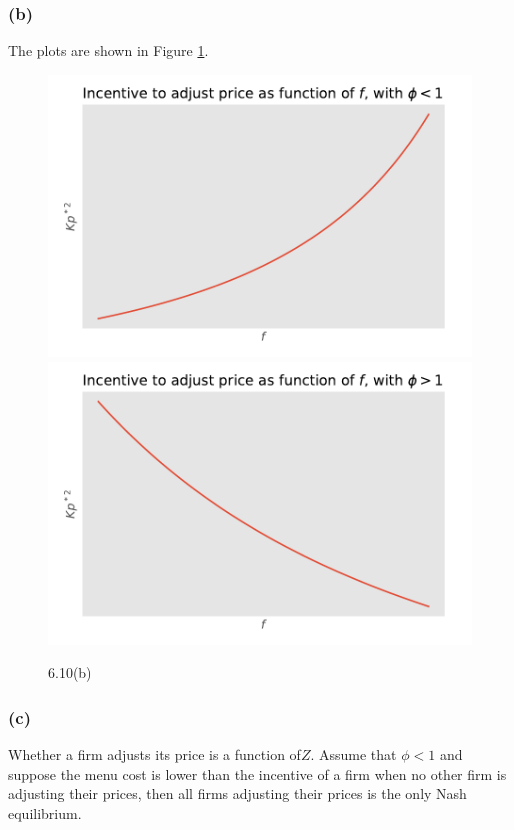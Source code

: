 \documentclass[12pt]{article}
\begin{document}
	\subsubsection*{(b)} The plots are shown in Figure \ref{misclabel}.
	\begin{figure}[htbp]
        \begin{center}
        \includegraphics[scale = 0.4]{phi_less_than_one}
        \includegraphics[scale = 0.4]{phi_greater_than_one}
        \caption{6.10(b)}
        \label{misclabel}
        \end{center}
    \end{figure}

	
	
	\subsubsection*{(c)} Whether a firm adjusts its price is a function of$Z$. 
	Assume that $\phi <1$ and suppose the menu cost is lower than the incentive of a firm when no other firm is adjusting their prices, then all firms adjusting their prices is the only Nash equilibrium. 
	
\end{document}
